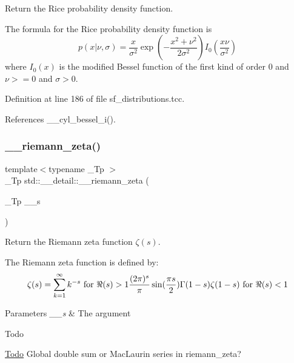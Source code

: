 Return the Rice probability density function. 

The formula for the Rice probability density function is \[ p(x|\nu,\sigma) = \frac{x}{\sigma^2} \exp\left(-\frac{x^2+\nu^2}{2\sigma^2}\right) I_0\left(\frac{x \nu}{\sigma^2}\right) \] where $I_0(x)$ is the modified Bessel function of the first kind of order 0 and $\nu >= 0$ and $\sigma > 0$. 

Definition at line 186 of file sf\+\_\+distributions.\+tcc.



References \+\_\+\+\_\+cyl\+\_\+bessel\+\_\+i().

\mbox{\label{namespacestd_1_1____detail_a2be77d9bdd1b8b463be44a0e7558bc2a}} 
\subsubsection{\texorpdfstring{\+\_\+\+\_\+riemann\+\_\+zeta()}{\_\_riemann\_zeta()}}
{\footnotesize\ttfamily template$<$typename \+\_\+\+Tp $>$ \\
\+\_\+\+Tp std\+::\+\_\+\+\_\+detail\+::\+\_\+\+\_\+riemann\+\_\+zeta (\begin{DoxyParamCaption}\item[{\+\_\+\+Tp}]{\+\_\+\+\_\+s }\end{DoxyParamCaption})}



Return the Riemann zeta function $ \zeta(s) $. 

The Riemann zeta function is defined by\+: \[ \zeta(s) = \sum_{k=1}^{\infty} k^{-s} \mbox{ for } \Re(s) > 1 \\ \frac{(2\pi)^s}{\pi} \sin(\frac{\pi s}{2}) \Gamma(1 - s) \zeta(1 - s) \mbox{ for } \Re(s) < 1 \]


\begin{DoxyParams}{Parameters}
{\em \+\_\+\+\_\+s} & The argument \\
\hline
\end{DoxyParams}
\begin{DoxyRefDesc}{Todo}
\item[\hyperlink{todo__todo000019}{Todo}]Global double sum or Mac\+Laurin series in riemann\+\_\+zeta? \end{DoxyRefDesc}


